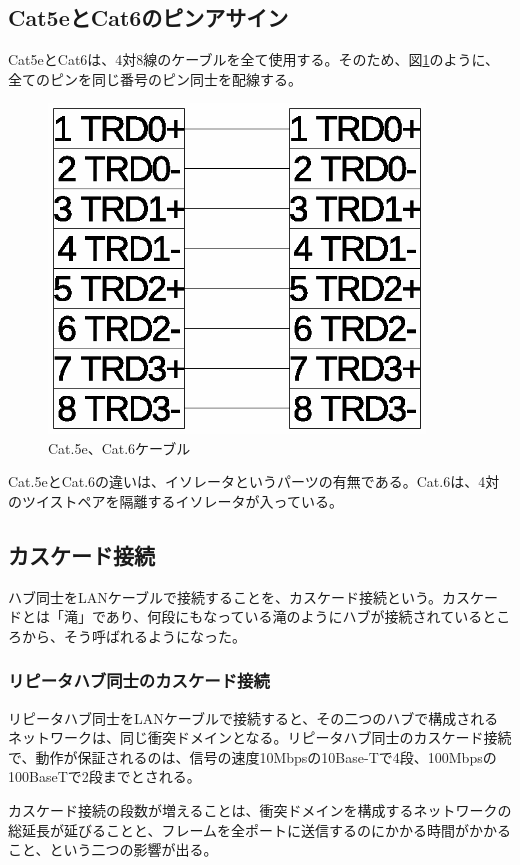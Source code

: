\subsection{Cat5eとCat6のピンアサイン}
Cat5eとCat6は、4対8線のケーブルを全て使用する。そのため、図\ref{fig:cat5e}のように、全てのピンを同じ番号のピン同士を配線する。

\begin{figure}[htbp]
	\includegraphics[width=10cm,clip]{draw/cat5e.eps}
	\caption{Cat.5e、Cat.6ケーブル}
	\label{fig:cat5e}
\end{figure}

Cat.5eとCat.6の違いは、イソレータというパーツの有無である。Cat.6は、4対のツイストペアを隔離するイソレータが入っている。

\subsection{カスケード接続}

ハブ同士をLANケーブルで接続することを、カスケード接続という。カスケードとは「滝」であり、何段にもなっている滝のようにハブが接続されているところから、そう呼ばれるようになった。

\subsubsection{リピータハブ同士のカスケード接続}

リピータハブ同士をLANケーブルで接続すると、その二つのハブで構成されるネットワークは、同じ衝突ドメインとなる。リピータハブ同士のカスケード接続で、動作が保証されるのは、信号の速度10Mbpsの10Base-Tで4段、100Mbpsの100BaseTで2段までとされる。

カスケード接続の段数が増えることは、衝突ドメインを構成するネットワークの総延長が延びることと、フレームを全ポートに送信するのにかかる時間がかかること、という二つの影響が出る。

